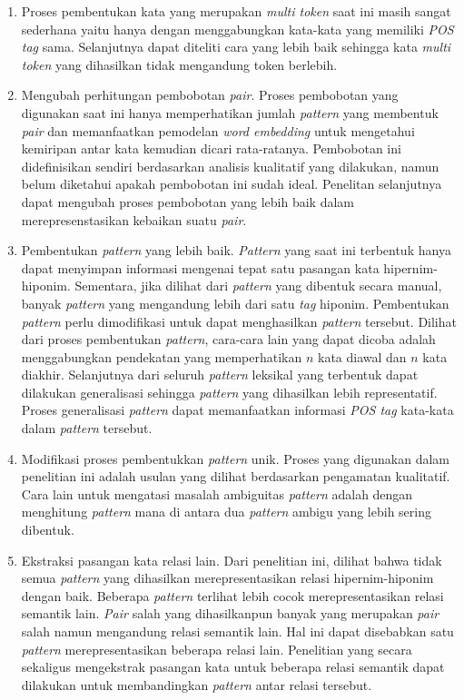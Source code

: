 \begin{enumerate}
  \item Proses pembentukan kata yang merupakan \textit{multi token} saat ini masih sangat sederhana yaitu hanya dengan menggabungkan kata-kata yang memiliki \textit{POS tag} sama. Selanjutnya dapat diteliti cara yang lebih baik sehingga kata \textit{multi token} yang dihasilkan tidak mengandung token berlebih.
  \item Mengubah perhitungan pembobotan \textit{pair}. Proses pembobotan yang digunakan saat ini hanya memperhatikan jumlah \textit{pattern} yang membentuk \textit{pair} dan memanfaatkan pemodelan \textit{word embedding} untuk mengetahui kemiripan antar kata kemudian dicari rata-ratanya. Pembobotan ini didefinisikan sendiri berdasarkan analisis kualitatif yang dilakukan, namun belum diketahui apakah pembobotan ini sudah ideal. Penelitan selanjutnya dapat mengubah proses pembobotan yang lebih baik dalam merepresenstasikan kebaikan suatu \textit{pair}.
  \item Pembentukan \textit{pattern} yang lebih baik. \textit{Pattern} yang saat ini terbentuk hanya dapat menyimpan informasi mengenai tepat satu pasangan kata hipernim-hiponim. Sementara, jika dilihat dari \textit{pattern} yang dibentuk secara manual, banyak \textit{pattern} yang mengandung lebih dari satu \textit{tag} hiponim. Pembentukan \textit{pattern} perlu dimodifikasi untuk dapat menghasilkan \textit{pattern} tersebut. Dilihat dari proses pembentukan \textit{pattern}, cara-cara lain yang dapat dicoba adalah menggabungkan pendekatan yang memperhatikan $n$ kata diawal dan $n$ kata diakhir. Selanjutnya dari seluruh \textit{pattern} leksikal yang terbentuk dapat dilakukan generalisasi sehingga \textit{pattern} yang dihasilkan lebih representatif. Proses generalisasi \textit{pattern} dapat memanfaatkan informasi \textit{POS tag} kata-kata dalam \textit{pattern} tersebut.
  \item Modifikasi proses pembentukkan \textit{pattern} unik. Proses yang digunakan dalam penelitian ini adalah usulan yang dilihat berdasarkan pengamatan kualitatif. Cara lain untuk mengatasi masalah ambiguitas \textit{pattern} adalah dengan menghitung \textit{pattern} mana di antara dua \textit{pattern} ambigu yang lebih sering dibentuk.
  \item Ekstraksi pasangan kata relasi lain. Dari penelitian ini, dilihat bahwa tidak semua \textit{pattern} yang dihasilkan merepresentasikan relasi hipernim-hiponim dengan baik. Beberapa \textit{pattern} terlihat lebih cocok merepresentasikan relasi semantik lain. \textit{Pair} salah yang dihasilkanpun banyak yang merupakan \textit{pair} salah namun mengandung relasi semantik lain. Hal ini dapat disebabkan satu \textit{pattern} merepresentasikan beberapa relasi lain. Penelitian yang secara sekaligus mengekstrak pasangan kata untuk beberapa relasi semantik dapat dilakukan untuk membandingkan \textit{pattern} antar relasi tersebut.

\end{enumerate}

